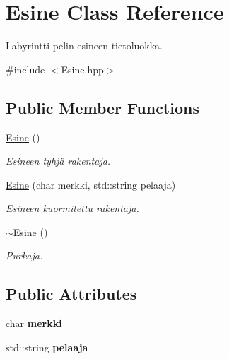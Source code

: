 \hypertarget{class_esine}{}\section{Esine Class Reference}
\label{class_esine}


Labyrintti-\/pelin esineen tietoluokka.  




{\ttfamily \#include $<$Esine.\+hpp$>$}

\subsection*{Public Member Functions}
\begin{DoxyCompactItemize}
\item 
\hyperlink{class_esine_ad3befbd3eb2ffa0993c2034e854cfadb}{Esine} ()
\begin{DoxyCompactList}\small\item\em Esineen tyhjä rakentaja. \end{DoxyCompactList}\item 
\hyperlink{class_esine_a62fb40b64b3f2773942dc609d415b521}{Esine} (char merkki, std\+::string pelaaja)
\begin{DoxyCompactList}\small\item\em Esineen kuormitettu rakentaja. \end{DoxyCompactList}\item 
\hyperlink{class_esine_a5d681e9b20aed1f63eda76c181c99ac4}{$\sim$\+Esine} ()
\begin{DoxyCompactList}\small\item\em Purkaja. \end{DoxyCompactList}\end{DoxyCompactItemize}
\subsection*{Public Attributes}
\begin{DoxyCompactItemize}
\item 
\hypertarget{class_esine_a8fc000d89cd0926b864c6242b9b51192}{}char {\bfseries merkki}\label{class_esine_a8fc000d89cd0926b864c6242b9b51192}

\item 
\hypertarget{class_esine_acbd8cbb1e704ecb09c75004ae29ad45f}{}std\+::string {\bfseries pelaaja}\label{class_esine_acbd8cbb1e704ecb09c75004ae29ad45f}

\end{DoxyCompactItemize}


